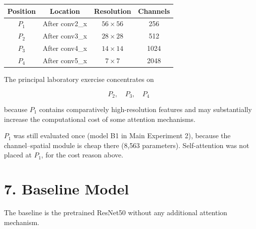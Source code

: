 \documentclass[10pt]{article}
\begin{document}
\begin{center}

\begin{tabular}{|c|c|c|c|}
\hline

\textbf{Position}
&
\textbf{Location}
&
\textbf{Resolution}
&
\textbf{Channels}
\\
\hline

$P_1$
&
After conv2\_x
&
$56\times56$
&
256
\\
\hline

$P_2$
&
After conv3\_x
&
$28\times28$
&
512
\\
\hline

$P_3$
&
After conv4\_x
&
$14\times14$
&
1024
\\
\hline

$P_4$
&
After conv5\_x
&
$7\times7$
&
2048
\\
\hline

\end{tabular}

\end{center}

The principal laboratory exercise concentrates on

\[
\boxed{
P_2,\quad P_3,\quad P_4
}
\]

because $P_1$ contains comparatively high-resolution features and may
substantially increase the computational cost of some attention mechanisms.

$P_1$ was still evaluated once (model B1 in Main Experiment 2), because the
channel--spatial module is cheap there (8{,}563 parameters). Self-attention
was not placed at $P_1$, for the cost reason above.

\section*{7. Baseline Model}

The baseline is the pretrained ResNet50 without any additional attention
mechanism.

\begin{center}


\end{center}
\end{document}
